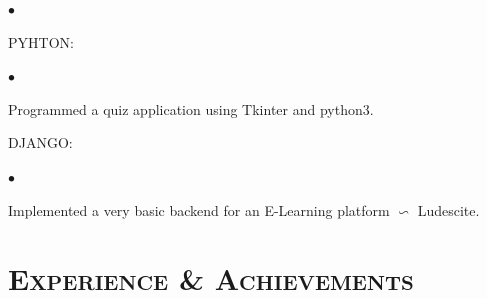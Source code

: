 \documentclass[9pt,a4paper]{extarticle}
\begin{document}
{\begin{minipage}{0.7\textwidth}
\begin{list}{$\bullet$}{}
\begin{flushright}
\begin{small}
\end{small}
\end{flushright}
\end{list}
\begin{large}
PYHTON:
\end{large}
\begin{list}{$\bullet$}{}
\item Programmed a quiz application using Tkinter and python3.
\begin{flushright}
\begin{small}
\end{small}
\end{flushright}
\end{list}
\begin{large}
DJANGO:
\end{large}
\begin{list}{$\bullet$}{}
\item Implemented a very basic backend for an E-Learning platform $\backsim$ Ludescite.
\begin{flushright}
\begin{small}
\end{small}
\end{flushright}
\end{list}

\end{minipage}}
\section*{\textsc{Experience \& Achievements}}
\end{document}
